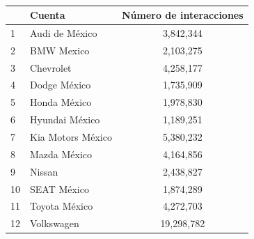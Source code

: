 \documentclass[a4paper,10pt]{article}
\begin{document}
\begin{center}
  \\[0.3cm]
  \begin{tabular}{l|l|c}
    \hline
    & Cuenta & Número de interacciones \\
    \hline
    1 & Audi de México & 3,842,344 \\
    2 & BMW Mexico & 2,103,275 \\
    3 & Chevrolet & 4,258,177 \\
    4 & Dodge México & 1,735,909 \\
    5 & Honda México & 1,978,830 \\
    6 & Hyundai México & 1,189,251 \\
    7 & Kia Motors México & 5,380,232 \\
    8 & Mazda México & 4,164,856 \\
    9 & Nissan & 2,438,827 \\
    10 & SEAT México & 1,874,289 \\
    11 & Toyota México & 4,272,703 \\
    12 & Volkswagen & 19,298,782 \\
    \hline
  \end{tabular}
\end{center}
\end{document}
